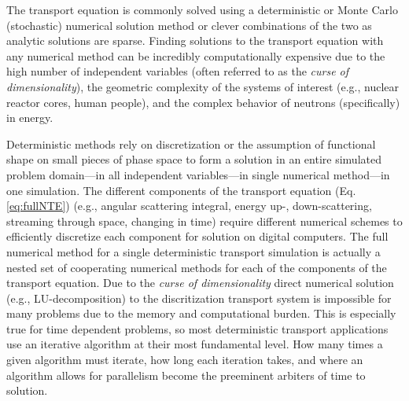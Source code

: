 The transport equation is commonly solved using a deterministic or Monte Carlo (stochastic) \cite{lux_1998} numerical solution method or clever combinations of the two \cite{monke_phd, pasmann_phd} as analytic solutions are sparse.
Finding solutions to the transport equation with any numerical method can be incredibly computationally expensive due to the high number of independent variables (often referred to as the \textit{curse of dimensionality}), the geometric complexity of the systems of interest (e.g., nuclear reactor cores, human people), and the complex behavior of neutrons (specifically) in energy.

Deterministic methods rely on discretization or the assumption of functional shape on small pieces of phase space to form a solution in an entire simulated problem domain---in all independent variables---in single numerical method---in one simulation.
The different components of the transport equation (Eq. \eqref{eq:fullNTE}) (e.g., angular scattering integral, energy up-, down-scattering, streaming through space, changing in time) require different numerical schemes to efficiently discretize each component for solution on digital computers.
The full numerical method for a single deterministic transport simulation is actually a nested set of cooperating numerical methods for each of the components of the transport equation.
Due to the \textit{curse of dimensionality} direct numerical solution (e.g., LU-decomposition) to the discritization transport system is impossible for many problems due to the memory and computational burden.
This is especially true for time dependent problems, so most deterministic transport applications use an iterative algorithm at their most fundamental level.
How many times a given algorithm must iterate, how long each iteration takes, and where an algorithm allows for parallelism become the preeminent arbiters of time to solution.

